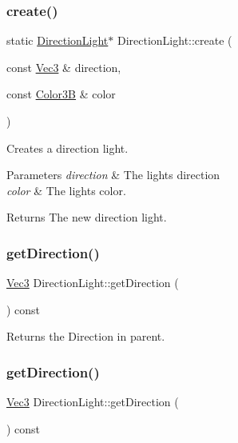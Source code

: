 \subsubsection{\texorpdfstring{create()}{create()}\hspace{0.1cm}{\footnotesize\ttfamily [2/2]}}
{\footnotesize\ttfamily static \hyperlink{classDirectionLight}{Direction\+Light}$\ast$ Direction\+Light\+::create (\begin{DoxyParamCaption}\item[{const \hyperlink{classVec3}{Vec3} \&}]{direction,  }\item[{const \hyperlink{structColor3B}{Color3B} \&}]{color }\end{DoxyParamCaption})\hspace{0.3cm}{\ttfamily [static]}}

Creates a direction light. 
\begin{DoxyParams}{Parameters}
{\em direction} & The light\textquotesingle{}s direction \\
\hline
{\em color} & The light\textquotesingle{}s color.\\
\hline
\end{DoxyParams}
\begin{DoxyReturn}{Returns}
The new direction light. 
\end{DoxyReturn}
\mbox{\label{classDirectionLight_ab083f506640a52cfa4d2484496041e38}} 
\subsubsection{\texorpdfstring{get\+Direction()}{getDirection()}\hspace{0.1cm}{\footnotesize\ttfamily [1/2]}}
{\footnotesize\ttfamily \hyperlink{classVec3}{Vec3} Direction\+Light\+::get\+Direction (\begin{DoxyParamCaption}{ }\end{DoxyParamCaption}) const}

Returns the Direction in parent. \mbox{\label{classDirectionLight_ab083f506640a52cfa4d2484496041e38}} 
\subsubsection{\texorpdfstring{get\+Direction()}{getDirection()}\hspace{0.1cm}{\footnotesize\ttfamily [2/2]}}
{\footnotesize\ttfamily \hyperlink{classVec3}{Vec3} Direction\+Light\+::get\+Direction (\begin{DoxyParamCaption}{ }\end{DoxyParamCaption}) const}

